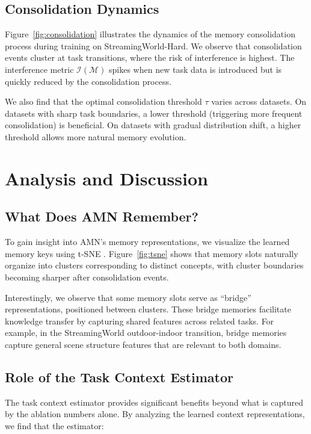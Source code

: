 \documentclass[11pt]{article}
\begin{document}
\subsection{Consolidation Dynamics}

Figure~\ref{fig:consolidation} illustrates the dynamics of the memory consolidation process during training on StreamingWorld-Hard. We observe that consolidation events cluster at task transitions, where the risk of interference is highest. The interference metric $\mathcal{I}(\mathcal{M})$ spikes when new task data is introduced but is quickly reduced by the consolidation process.

We also find that the optimal consolidation threshold $\tau$ varies across datasets. On datasets with sharp task boundaries, a lower threshold (triggering more frequent consolidation) is beneficial. On datasets with gradual distribution shift, a higher threshold allows more natural memory evolution.

\section{Analysis and Discussion}
\label{sec:analysis}

\subsection{What Does AMN Remember?}

To gain insight into AMN's memory representations, we visualize the learned memory keys using t-SNE \citep{maaten2008visualizing}. Figure~\ref{fig:tsne} shows that memory slots naturally organize into clusters corresponding to distinct concepts, with cluster boundaries becoming sharper after consolidation events.

Interestingly, we observe that some memory slots serve as ``bridge'' representations, positioned between clusters. These bridge memories facilitate knowledge transfer by capturing shared features across related tasks. For example, in the StreamingWorld outdoor-indoor transition, bridge memories capture general scene structure features that are relevant to both domains.

\subsection{Role of the Task Context Estimator}

The task context estimator provides significant benefits beyond what is captured by the ablation numbers alone. By analyzing the learned context representations, we find that the estimator:
\end{document}
